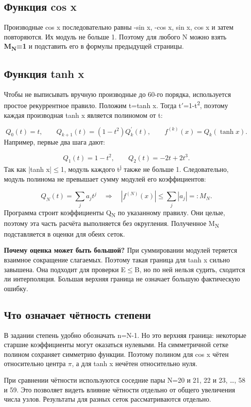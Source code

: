 \documentclass[12pt,a4paper]{article}
\begin{document}
\subsection{Функция cos x}
Производные cos x последовательно равны -sin x, -cos x, sin x, cos x и затем повторяются. Их модуль не больше 1. Поэтому для любого N можно взять \textbf{M\textsubscript{N}=1} и подставить его в формулы предыдущей страницы.

\subsection{Функция tanh x}
Чтобы не выписывать вручную производные до 60-го порядка, используется простое рекуррентное правило. Положим t=tanh x. Тогда t\ensuremath{\prime}=1-t\textsuperscript{2}, поэтому каждая производная tanh x является полиномом от t:

\[
Q_0(t)=t,\qquad Q_{k+1}(t)=(1-t^2)Q_k^{\prime}(t),\qquad f^{(k)}(x)=Q_k(\tanh x).
\]
Например, первые два шага дают:

\[
Q_1(t)=1-t^2,\qquad Q_2(t)=-2t+2t^3.
\]
Так как |tanh x|\ensuremath{\leq}1, модуль каждого t\textsuperscript{j} также не больше 1. Следовательно, модуль полинома не превышает сумму модулей его коэффициентов:

\[
Q_N(t)=\sum_j a_jt^j\quad\Longrightarrow\quad |f^{(N)}(x)|\leq\sum_j|a_j|=:M_N.
\]
Программа строит коэффициенты Q\textsubscript{N} по указанному правилу. Они целые, поэтому эта часть расчёта выполняется без округления. Полученное M\textsubscript{N} подставляется в оценки для обеих сеток.

\textbf{Почему оценка может быть большой?} При суммировании модулей теряется взаимное сокращение слагаемых. Поэтому такая граница для tanh x сильно завышена. Она подходит для проверки E\ensuremath{\leq}B, но по ней нельзя судить, сходится ли интерполяция. Большая верхняя граница не означает большую фактическую ошибку.

\subsection{Что означает чётность степени}
В задании степень удобно обозначать n=N-1. Но это верхняя граница: некоторые старшие коэффициенты могут оказаться нулевыми. На симметричной сетке полином сохраняет симметрию функции. Поэтому полином для cos x чётен относительно центра \ensuremath{\pi}, а для tanh x нечётен относительно нуля.

При сравнении чётности используются соседние пары N=20 и 21, 22 и 23, \ldots{}, 58 и 59. Это позволяет видеть влияние чётности отдельно от общего увеличения числа узлов. Результаты для разных сеток рассматриваются отдельно.
\end{document}
